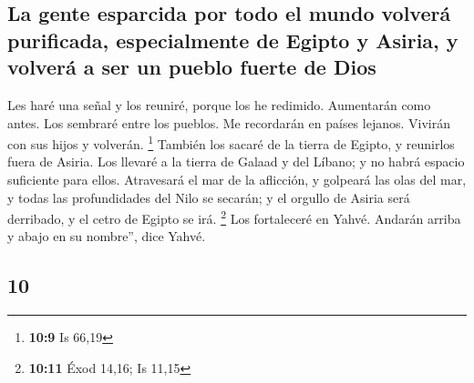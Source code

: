 \begin{paracol}{2}
\hypertarget{la-gente-esparcida-por-todo-el-mundo-volveruxe1-purificada-especialmente-de-egipto-y-asiria-y-volveruxe1-a-ser-un-pueblo-fuerte-de-dios}{%
\subsection{La gente esparcida por todo el mundo volverá purificada,
especialmente de Egipto y Asiria, y volverá a ser un pueblo fuerte de
Dios}\label{la-gente-esparcida-por-todo-el-mundo-volveruxe1-purificada-especialmente-de-egipto-y-asiria-y-volveruxe1-a-ser-un-pueblo-fuerte-de-dios}}

 Les haré una señal y los reuniré, porque los he redimido.
Aumentarán como antes.  Los sembraré entre los pueblos. Me
recordarán en países lejanos. Vivirán con sus hijos y volverán.
\footnote{\textbf{10:9} Is 66,19}  También los sacaré de
la tierra de Egipto, y reunirlos fuera de Asiria. Los llevaré a la
tierra de Galaad y del Líbano; y no habrá espacio suficiente para ellos.
 Atravesará el mar de la aflicción, y golpeará las olas
del mar, y todas las profundidades del Nilo se secarán; y el orgullo de
Asiria será derribado, y el cetro de Egipto se irá. \footnote{\textbf{10:11}
  Éxod 14,16; Is 11,15}  Los fortaleceré en Yahvé.
Andarán arriba y abajo en su nombre'', dice Yahvé.

\switchcolumn
\begin{otherlanguage}{english}

\hypertarget{section-19}{%
\section{10}\label{section-19}}


\end{otherlanguage}
\end{paracol}
